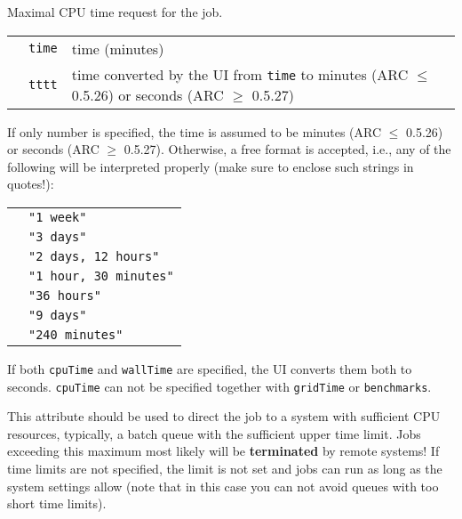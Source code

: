   Maximal CPU time request for the job. 

  \begin{tabular}{llp{10cm}}
    \hspace*{1cm}&\texttt{time} & time (minutes)\\
    \hspace*{1cm}&\texttt{tttt} & time converted by the UI from \texttt{time} to 
    minutes (ARC $\leq$ 0.5.26) or seconds (ARC $\geq$ 0.5.27)\\
  \end{tabular}
  
  If only number is specified, the time is assumed to be minutes (ARC
  $\leq$ 0.5.26) or seconds (ARC $\geq$ 0.5.27). Otherwise, a free
  format is accepted, i.e., any of the following will be interpreted
  properly (make sure to enclose such strings in quotes!):

  \begin{tabular}{ll}
    \hspace*{1cm}&\texttt{"1 week"}\\
    \hspace*{1cm}&\texttt{"3 days"}\\
    \hspace*{1cm}&\texttt{"2 days, 12 hours"}\\
    \hspace*{1cm}&\texttt{"1 hour, 30 minutes"}\\
    \hspace*{1cm}&\texttt{"36 hours"}\\
    \hspace*{1cm}&\texttt{"9 days"}\\
    \hspace*{1cm}&\texttt{"240 minutes"}\\
  \end{tabular}
 
  If both \texttt{cpuTime} and \texttt{wallTime} are specified, the UI converts them both to 
  seconds. \texttt{cpuTime} can not be specified together with \texttt{gridTime}
  or \texttt{benchmarks}.
 
  \begin{framed}
    This attribute should be used to direct the job to a system with
    sufficient CPU resources, typically, a batch queue with the
    sufficient upper time limit. Jobs exceeding this maximum most
    likely will be \textbf{terminated} by remote systems! If
    time limits are not specified, the limit is not set and jobs
   can run as long as the system settings allow (note that in this
    case you can not avoid queues with too short time limits).
  \end{framed}

